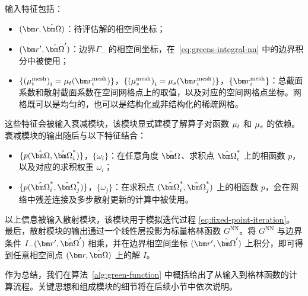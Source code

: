 输入特征包括：
\begin{itemize}\label{list:attenuation-inputs}
    \item $(\br,\bOmega)$：待评估解的相空间坐标；
    \item $(\br',\bOmega')$：边界$\Gamma_-$ 的相空间坐标，在~\eqref{eq:greens-integral-nn} 中的边界积分中被使用；
    \item $\{{(\mu_t^{\text{mesh}})}_i=\mu_t(\br^{\text{mesh}}_i)\}$，$\{{(\mu_s^{\text{mesh}})}_i=\mu_s(\br^{\text{mesh}}_i)\}$，$\{\br^{\text{mesh}}_i\}$：总截面系数和散射截面系数在空间网格点上的取值，以及对应的空间网格点坐标。网格既可以是均匀的，也可以是结构化或非结构化的稀疏网格。
\end{itemize}
这些特征会被输入衰减模块，该模块显式建模了解算子对函数 $\mu_t$ 和 $\mu_s$ 的依赖。
衰减模块的输出随后与以下特征结合：
\begin{itemize}
    \item  $\{p(\bOmega, \bOmega^*_i)\}$，$\{\omega_i\}$：在任意角度 $\bOmega$、求积点 $\bOmega^*_i$ 上的相函数 $p$，以及对应的求积权重 $\omega_i$；
    \item  $\{p(\bOmega^*_i, \bOmega^*_j)\}$，$\{\omega_j\}$：在求积点 $(\bOmega^*_i, \bOmega^*_j)$ 上的相函数 $p$，会在网络中残差连接及多步散射更新的计算中被使用。
\end{itemize}
以上信息被输入散射模块，该模块用于模拟迭代过程 \eqref{eq:fixed-point-iteration}。
最后，散射模块的输出通过一个线性层投影为标量格林函数 $G^{\text{NN}}$。将 $G^{\text{NN}}$ 与边界条件 $I_{-}(\br',\bOmega')$ 相乘，并在边界相空间坐标 $(\br',\bOmega')$ 上积分，即可得到任意相空间点 $(\br,\bOmega)$ 上的解 $I$。

作为总结，我们在算法~\ref{alg:green-function} 中概括给出了从输入到格林函数的计算流程。关键思想和组成模块的细节将在后续小节中依次说明。


